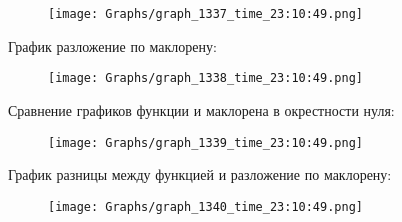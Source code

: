 \begin{figure}[H]
\centering
\texttt{[image: Graphs/graph\_1337\_time\_23:10:49.png]}
\end{figure}
График разложение по маклорену:

\begin{figure}[H]
\centering
\texttt{[image: Graphs/graph\_1338\_time\_23:10:49.png]}
\end{figure}
Сравнение графиков функции и маклорена в окрестности нуля:

\begin{figure}[H]
\centering
\texttt{[image: Graphs/graph\_1339\_time\_23:10:49.png]}
\end{figure}
График разницы между функцией и разложение по маклорену:

\begin{figure}[H]
\centering
\texttt{[image: Graphs/graph\_1340\_time\_23:10:49.png]}
\end{figure}
